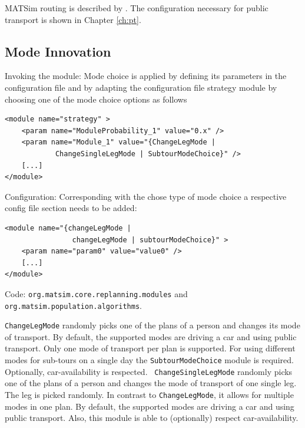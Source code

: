 MATSim routing is described by \citet[]{LefebvreBalmer_STRC_2007, LefebvreBalmer_TechRep_IVT_2007}. The configuration necessary for public transport is shown in Chapter \ref{ch:pt}.

\subsection{Mode Innovation}
\label{sec:modechoice}
\begin{compactitem}
\item Invoking the module: Mode choice is applied by defining its parameters in the configuration file and by adapting the configuration file strategy module by choosing one of the mode choice options as follows
\begin{lstlisting}
<module name="strategy" >
    <param name="ModuleProbability_1" value="0.x" />
    <param name="Module_1" value="{ChangeLegMode |
    		ChangeSingleLegMode | SubtourModeChoice}" />
    [...]
</module>
\end{lstlisting}
%
\item Configuration: Corresponding with the chose type of mode choice a respective config file section needs to be added:
%
\begin{lstlisting}
<module name="{changeLegMode |
				changeLegMode | subtourModeChoice}" >
    <param name="param0" value="value0" />
    [...]
</module>
\end{lstlisting}
%
\item Code: \lstinline|org.matsim.core.replanning.modules| and \lstinline|org.matsim.population.algorithms|.
\end{compactitem}

\lstinline|ChangeLegMode| randomly picks one of the plans of a person and changes its mode of transport. By default, the supported modes are driving a car and using public transport. Only one mode of transport per plan is supported. For using different modes for sub-tours on a single day the \lstinline|SubtourModeChoice| module is required. Optionally, car-availability is respected. \lstinline| ChangeSingleLegMode| randomly picks one of the plans of a person and changes the mode of transport of one single leg. The leg is picked randomly. In contrast to \lstinline|ChangeLegMode|, it allows for multiple modes in one plan. By default, the supported modes are driving a car and using public transport. Also, this module is able to (optionally) respect car-availability.

